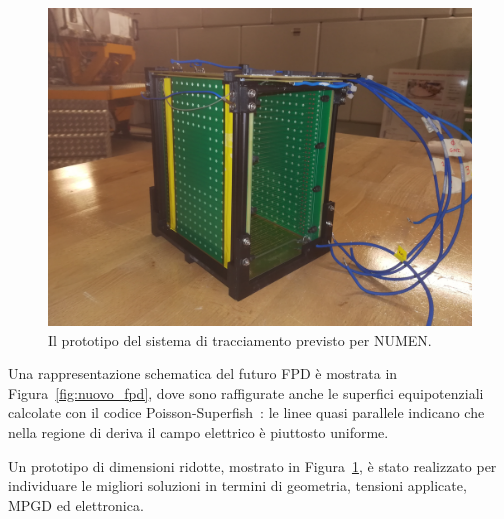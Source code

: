 \begin{figure} [!p]
	\centering
	\includegraphics[width=\textwidth, keepaspectratio]{Grafici/castelletto3.jpg}
	\caption{Il prototipo del sistema di tracciamento previsto per NUMEN.} \label{fig:castelletto}
\end{figure}



Una rappresentazione schematica del futuro FPD è mostrata in Figura~\ref{fig:nuovo_fpd}, dove sono raffigurate anche le superfici equipotenziali calcolate con il codice Poisson-Superfish~\cite{superfish:87}: le linee quasi parallele indicano che nella regione di deriva il campo elettrico è piuttosto uniforme.


Un prototipo di dimensioni ridotte, mostrato in Figura~\ref{fig:castelletto}, è stato realizzato per individuare le migliori soluzioni in termini di geometria, tensioni applicate, MPGD ed elettronica.










\section{}


